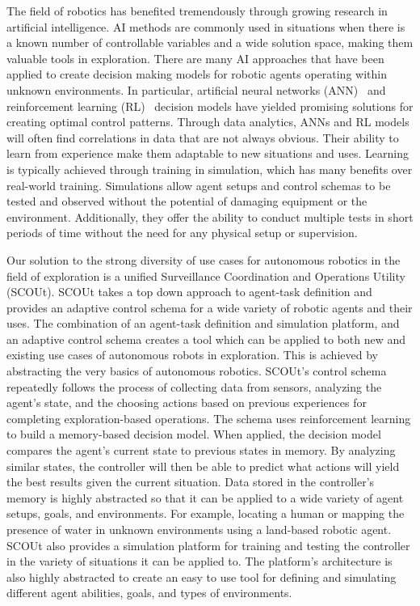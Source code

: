 The field of robotics has benefited tremendously through growing research in artificial intelligence.
AI methods are commonly used in situations when there is a known number of controllable variables and a wide solution space, making them valuable tools in exploration.
There are many AI approaches that have been applied to create decision making models for robotic agents operating within unknown environments.
In particular, artificial neural networks (ANN)~\cite{kiumarsi_optimal_2018, arulkumaran_brief_2017, tai_autonomous_2017, bai_toward_2017} and reinforcement learning (RL)~\cite{kiumarsi_optimal_2018, arulkumaran_brief_2017, sutton_reinforcement_1998} decision models have yielded promising solutions for creating optimal control patterns.
Through data analytics, ANNs and RL models will often find correlations in data that are not always obvious.
Their ability to learn from experience make them adaptable to new situations and uses.
Learning is typically achieved through training in simulation, which has many benefits over real-world training.
Simulations allow agent setups and control schemas to be tested and observed without the potential of damaging equipment or the environment.
Additionally, they offer the ability to conduct multiple tests in short periods of time without the need for any physical setup or supervision.

Our solution to the strong diversity of use cases for autonomous robotics in the field of exploration is a unified Surveillance Coordination and Operations Utility (SCOUt).
SCOUt takes a top down approach to agent-task definition and provides an adaptive control schema for a wide variety of robotic agents and their uses.
The combination of an agent-task definition and simulation platform, and an adaptive control schema creates a tool which can be applied to both new and existing use cases of autonomous robots in exploration.
This is achieved by abstracting the very basics of autonomous robotics.
SCOUt's control schema repeatedly follows the process of collecting data from sensors, analyzing the agent's state, and the choosing actions based on previous experiences for completing exploration-based operations.
The schema uses reinforcement learning to build a memory-based decision model.
When applied, the decision model compares the agent's current state to previous states in memory.
By analyzing similar states, the controller will then be able to predict what actions will yield the best results given the current situation.
Data stored in the controller's memory is highly abstracted so that it can be applied to a wide variety of agent setups, goals, and environments.
For example, locating a human or mapping the presence of water in unknown environments using a land-based robotic agent.
SCOUt also provides a simulation platform for training and testing the controller in the variety of situations it can be applied to.
The platform's architecture is also highly abstracted to create an easy to use tool for defining and simulating different agent abilities, goals, and types of environments.

